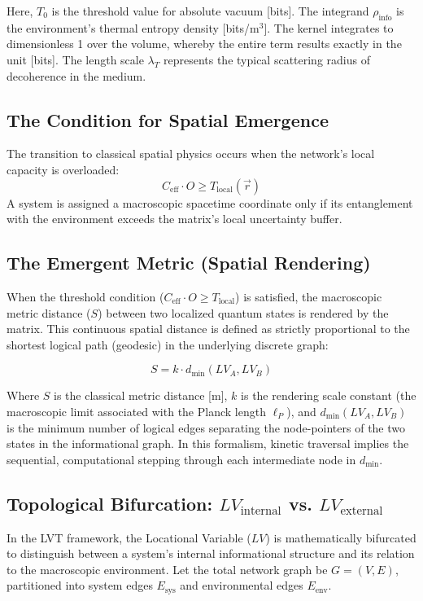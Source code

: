 \documentclass[12pt,a4paper]{article}
\begin{document}
Here, $T_0$ is the threshold value for absolute vacuum [bits]. The integrand $\rho_{\mathrm{info}}$ is the environment's thermal entropy density [bits/m$^3$]. The kernel integrates to dimensionless 1 over the volume, whereby the entire term results exactly in the unit [bits]. The length scale $\lambda_T$ represents the typical scattering radius of decoherence in the medium.

\subsection{The Condition for Spatial Emergence}
The transition to classical spatial physics occurs when the network's local capacity is overloaded:
\begin{equation}\label{eq:threshold}
C_{\mathrm{eff}} \cdot O \geq T_{\mathrm{local}}(\vec{r})
\end{equation}
A system is assigned a macroscopic spacetime coordinate only if its entanglement with the environment exceeds the matrix's local uncertainty buffer.

\subsection{The Emergent Metric (Spatial Rendering)}
When the threshold condition ($C_{\mathrm{eff}} \cdot O \geq T_{\mathrm{local}}$) is satisfied, the macroscopic metric distance ($S$) between two localized quantum states is rendered by the matrix. This continuous spatial distance is defined as strictly proportional to the shortest logical path (geodesic) in the underlying discrete graph:

\begin{equation}\label{eq:spatial_rendering}
S = k \cdot d_{\mathrm{min}}(LV_A, LV_B)
\end{equation}

Where $S$ is the classical metric distance [m], $k$ is the rendering scale constant (the macroscopic limit associated with the Planck length $\ell_P$), and $d_{\mathrm{min}}(LV_A, LV_B)$ is the minimum number of logical edges separating the node-pointers of the two states in the informational graph. In this formalism, kinetic traversal implies the sequential, computational stepping through each intermediate node in $d_{\mathrm{min}}$.

\subsection{Topological Bifurcation: $LV_{\mathrm{internal}}$ vs. $LV_{\mathrm{external}}$}
In the LVT framework, the Locational Variable ($LV$) is mathematically bifurcated to distinguish between a system's internal informational structure and its relation to the macroscopic environment. Let the total network graph be $G = (V, E)$, partitioned into system edges $E_{\mathrm{sys}}$ and environmental edges $E_{\mathrm{env}}$.
\end{document}

